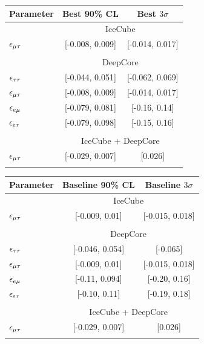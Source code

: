 {%
{\renewcommand{\arraystretch}{1.0}
 \begin{table}
   \begin{center}
      \begin{tabular}{lcc}
         \hline
         Parameter & Best 90\% CL & Best $3\sigma$\\
         \hline & \multicolumn{2}{c}{IceCube}  \\
         $\epsilon_{\mu\tau}$ &  [-0.008, 0.009] &  [-0.014, 0.017]  \\\\
         & \multicolumn{2}{c}{DeepCore}\\ [0.3em]
         $\epsilon_{\tau\tau}$ &  [-0.044, 0.051] &  [-0.062, 0.069] \\
         $\epsilon_{\mu\tau}$ &  [-0.008, 0.009] &  [-0.014, 0.017] \\
         $\epsilon_{e\mu}$ &  [-0.079, 0.081] &   [-0.16, 0.14] \\
         $\epsilon_{e\tau}$ &  [-0.079, 0.098] &  [-0.15, 0.16] \\\\
         &\multicolumn{2}{c}{IceCube + DeepCore} \\
         $\epsilon_{\mu\tau}$ &  [-0.029, 0.007] &          [0.026] \\
         \hline
         \vspace{2em}
      \end{tabular}
      \begin{tabular}{lcc}
         \hline
         Parameter & Baseline 90\% CL & Baseline $3\sigma$ \\
         \hline & \multicolumn{2}{c}{IceCube}  \\
         $\epsilon_{\mu\tau}$ &  [-0.009, 0.01] &  [-0.015, 0.018]  \\\\
         & \multicolumn{2}{c}{DeepCore}\\ [0.3em]
         $\epsilon_{\tau\tau}$ &    [-0.046, 0.054] &         [-0.065]  \\
         $\epsilon_{\mu\tau}$ &     [-0.009, 0.01] &  [-0.015, 0.018]  \\
         $\epsilon_{e\mu}$ &  [-0.11, 0.094] &  [-0.20, 0.16]    \\
         $\epsilon_{e\tau}$ &    [-0.10, 0.11] &  [-0.19, 0.18]  \\\\
         &\multicolumn{2}{c}{IceCube + DeepCore}\\
         $\epsilon_{\mu\tau}$ &   [-0.029, 0.007] &          [0.026] \\
         \hline
         \vspace{2em}

\end{tabular}
\end{center}
\end{table}}}
